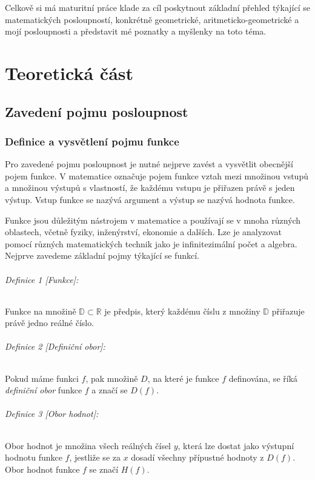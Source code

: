 \documentclass[12pt]{report}			%
\begin{document}
Celkově si má maturitní práce klade za cíl poskytnout základní přehled týkající se matematických posloupností, konkrétně geometrické, aritmeticko-geometrické a mojí posloupnosti a představit mé poznatky a myšlenky na toto téma.

	
	
	\part{Teoretická část}
	
		\chapter{Zavedení pojmu posloupnost}
		
			
			\section{Definice a vysvětlení pojmu funkce}
Pro zavedené pojmu posloupnost je nutné nejprve zavést a vysvětlit obecnější pojem funkce. V matematice označuje pojem funkce vztah mezi množinou vstupů a množinou výstupů s vlastností, že každému vstupu je přiřazen právě s jeden výstup. Vstup funkce se nazývá argument a výstup se nazývá hodnota funkce.

Funkce jsou důležitým nástrojem v matematice a používají se v mnoha různých oblastech, včetně fyziky, inženýrství, ekonomie a dalších. Lze je analyzovat pomocí různých matematických technik jako je infinitezimální počet a algebra. Nejprve zavedeme základní pojmy týkající se funkcí.


				\paragraph{Definice 1 [Funkce]:}
 Funkce na množině $\mathbb{D} \subset \mathbb{R}$ je předpis, který každému číslu z množiny  $\mathbb{D}$ přiřazuje právě jedno reálné číslo.

				\paragraph{Definice 2 [Definiční obor]:}
Pokud máme funkci $f$, pak množině $D$, na které je funkce $f$ definována, se říká \emph{definiční obor} funkce $f$ a značí se $D(f)$.
		\paragraph{Definice 3 [Obor hodnot]:}
Obor hodnot je množina všech reálných čísel $y$, která lze dostat jako výstupní hodnotu funkce $f$, jestliže se za $x$ dosadí všechny přípustné hodnoty z $D(f)$. Obor hodnot funkce $f$ se značí $H(f)$.
\end{document}
